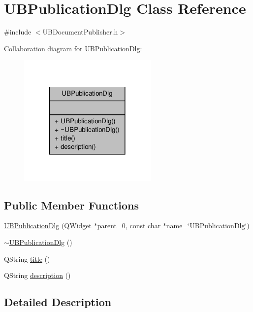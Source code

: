 \hypertarget{class_u_b_publication_dlg}{\section{U\-B\-Publication\-Dlg Class Reference}
\label{d7/daf/class_u_b_publication_dlg}
}


{\ttfamily \#include $<$U\-B\-Document\-Publisher.\-h$>$}



Collaboration diagram for U\-B\-Publication\-Dlg\-:
\nopagebreak
\begin{figure}[H]
\begin{center}
\leavevmode
\includegraphics[width=194pt]{dd/d26/class_u_b_publication_dlg__coll__graph}
\end{center}
\end{figure}
\subsection*{Public Member Functions}
\begin{DoxyCompactItemize}
\item 
\hyperlink{class_u_b_publication_dlg_a2f7adf61647f7c0c5a26e7e3267c077b}{U\-B\-Publication\-Dlg} (Q\-Widget $\ast$parent=0, const char $\ast$name=\char`\"{}U\-B\-Publication\-Dlg\char`\"{})
\item 
\hyperlink{class_u_b_publication_dlg_aded6039b67e12da4df5ae050eb2b012e}{$\sim$\-U\-B\-Publication\-Dlg} ()
\item 
Q\-String \hyperlink{class_u_b_publication_dlg_a79f81d1a7e514f34a8ae593cef4d1a9e}{title} ()
\item 
Q\-String \hyperlink{class_u_b_publication_dlg_ab89586fd90f3ce1e55bcce34995653cf}{description} ()
\end{DoxyCompactItemize}


\subsection{Detailed Description}


